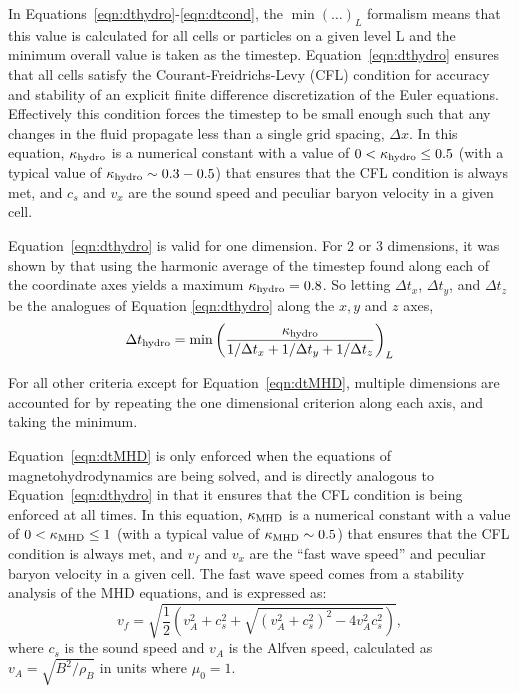 
In Equations~\ref{eqn:dthydro}-\ref{eqn:dtcond}, the $\min ( \ldots
)_L$ formalism means that this value is calculated for all cells or
particles on a
given level L and the minimum overall value is taken as the timestep.
Equation~\ref{eqn:dthydro} ensures that all cells satisfy the
Courant-Freidrichs-Levy (CFL) condition for accuracy and stability of
an explicit finite difference discretization of the Euler equations.
Effectively this condition forces the timestep to be small enough such
that any changes in the fluid propagate less than a single grid
spacing, $\Delta x$.  In this equation, $\kappa_{\rm hydro}$ is a
numerical constant with a value of $0 < \kappa_{\rm hydro} \leq 0.5$
(with a typical value of $\kappa_{\rm hydro} \sim 0.3-0.5$) that
ensures that the CFL condition is always met, and $c_s$ and $v_x$ are
the sound speed and peculiar baryon velocity in a given cell.

Equation~\ref{eqn:dthydro} is valid for one dimension.  For 2 or 3
dimensions, it was shown by \cite{Godunov1959}  that using the
harmonic average of the timestep found along each of the coordinate
axes yields a maximum $\kappa_{\rm hydro} = 0.8$.  So letting $\Delta
t_x$, $\Delta t_y$, and $\Delta t_z$ be the analogues of
Equation \ref{eqn:dthydro} along the $x,y$ and $z$ axes, 
\begin{equation}
  \Delta t_{\rm hydro} = \min \left( \frac{\kappa_{\rm hydro}} {1/\Delta t_x
  +1/\Delta t_y + 1/\Delta t_z} \right)_L
\end{equation}

For all other criteria except for Equation~\ref{eqn:dtMHD}, multiple dimensions are accounted for by
repeating the one dimensional criterion along each axis, and taking
the minimum.

Equation~\ref{eqn:dtMHD} is only enforced when the equations of
magnetohydrodynamics are being solved, and is directly analogous to
Equation~\ref{eqn:dthydro} in that it ensures that the CFL condition
is being enforced at all times.  In this equation, $\kappa_{\rm MHD}$ is a
numerical constant with a value of $0 < \kappa_{\rm MHD} \leq 1$ (with a
typical value of $\kappa_{\rm MHD} \sim 0.5$) that ensures that the CFL
condition is always met, and $v_f$ and $v_x$ are the ``fast wave
speed'' and peculiar baryon velocity in a given cell.  The fast wave
speed comes from a stability analysis of the MHD equations, and is
expressed as:
%
\begin{equation}
v_f = \sqrt{ \frac{1}{2} \left(  v_A^2 + c_s^2 + \sqrt{(v_A^2 +
      c_s^2)^2 - 4 v_A^2 c_s^2}  \right)  },
\label{eqn:vfastmhd}
\end{equation}
%
where $c_s$ is the sound speed and $v_A$ is the Alfven speed, calculated
as $v_A = \sqrt{B^2/\rho_B}$ in units where $\mu_0 = 1$.

